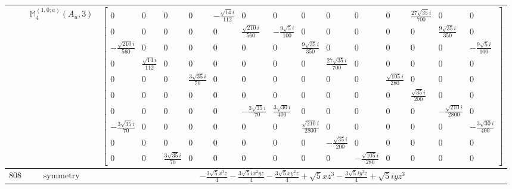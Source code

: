 \documentclass[fleqn,8pt,landscape]{jsarticle}
\begin{document}
\begin{longtable}{ccc}
$  $ & $ \mathbb{M}_{4}^{(1,0;a)}(A_{u},3) $ & $ \begin{bmatrix} 0 & 0 & 0 & 0 & - \frac{\sqrt{14} i}{112} & 0 & 0 & 0 & 0 & 0 & 0 & \frac{27 \sqrt{35} i}{700} & 0 & 0 \\ 0 & 0 & 0 & 0 & 0 & \frac{\sqrt{210} i}{560} & - \frac{9 \sqrt{5} i}{100} & 0 & 0 & 0 & 0 & 0 & \frac{9 \sqrt{35} i}{350} & 0 \\ - \frac{\sqrt{210} i}{560} & 0 & 0 & 0 & 0 & 0 & 0 & \frac{9 \sqrt{35} i}{350} & 0 & 0 & 0 & 0 & 0 & - \frac{9 \sqrt{5} i}{100} \\ 0 & \frac{\sqrt{14} i}{112} & 0 & 0 & 0 & 0 & 0 & 0 & \frac{27 \sqrt{35} i}{700} & 0 & 0 & 0 & 0 & 0 \\ 0 & 0 & 0 & \frac{3 \sqrt{35} i}{70} & 0 & 0 & 0 & 0 & 0 & 0 & \frac{\sqrt{105} i}{280} & 0 & 0 & 0 \\ 0 & 0 & 0 & 0 & 0 & 0 & 0 & 0 & 0 & 0 & 0 & \frac{\sqrt{35} i}{200} & 0 & 0 \\ 0 & 0 & 0 & 0 & 0 & - \frac{3 \sqrt{35} i}{70} & \frac{3 \sqrt{30} i}{400} & 0 & 0 & 0 & 0 & 0 & - \frac{\sqrt{210} i}{2800} & 0 \\ - \frac{3 \sqrt{35} i}{70} & 0 & 0 & 0 & 0 & 0 & 0 & \frac{\sqrt{210} i}{2800} & 0 & 0 & 0 & 0 & 0 & - \frac{3 \sqrt{30} i}{400} \\ 0 & 0 & 0 & 0 & 0 & 0 & 0 & 0 & - \frac{\sqrt{35} i}{200} & 0 & 0 & 0 & 0 & 0 \\ 0 & 0 & \frac{3 \sqrt{35} i}{70} & 0 & 0 & 0 & 0 & 0 & 0 & - \frac{\sqrt{105} i}{280} & 0 & 0 & 0 & 0 \end{bmatrix} $ \\ \hline
$ 808 $ & $ \text{symmetry} $ & $ - \frac{3 \sqrt{5} x^{3} z}{4} - \frac{3 \sqrt{5} i x^{2} y z}{4} - \frac{3 \sqrt{5} x y^{2} z}{4} + \sqrt{5} x z^{3} - \frac{3 \sqrt{5} i y^{3} z}{4} + \sqrt{5} i y z^{3} $ \\

\end{longtable}
\end{document}
